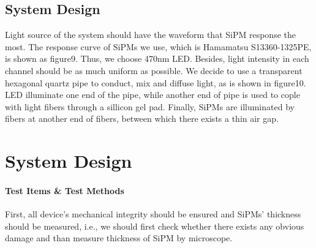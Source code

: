 \documentclass[11pt,a4paper]{article}
\begin{document}
\begin{figure}[ht]
\end{figure}
    
\subsection{System Design}

Light source of the system should have the waveform that SiPM response the most. The response curve of SiPMs we use, which is Hamamatsu S13360-1325PE, is shown as figure9. Thus, we choose 470nm LED. Besides, light intensity in each channel should be as much uniform as possible. We decide to use a transparent hexagonal quartz pipe to conduct, mix and diffuse light, as is shown in figure10. LED illuminate one end of the pipe, while another end of pipe is used to cople with light fibers through a sillicon gel pad. Finally, SiPMs are illuminated by fibers at another end of fibers, between which there exists a thin air gap.

\section{System Design}
\paragraph{Test Items \& Test Methods}First, all device's mechanical integrity should be ensured and SiPMs' thickness should be measured,
i.e., we should first check whether there exists any obvious damage and than measure thickness of SiPM by microscope.
\end{document}
